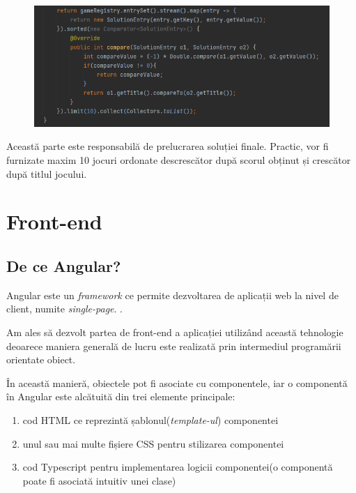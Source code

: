 \documentclass[12pt,a4paper]{report}
\begin{document}
\begin{figure}[H]
\centering
\caption{}
\begin{adjustbox}{max size={\textwidth}{\textheight}}
\includegraphics[scale = 0.9]{exemplu_29_third_part}
\end{adjustbox}
\caption*{}
\end{figure}

Această parte este responsabilă de prelucrarea soluției finale. Practic, vor fi furnizate maxim 10 jocuri ordonate descrescător după scorul obținut și crescător după titlul jocului.

\section{Front-end}

\subsection{De ce Angular?}

Angular este un \emph{framework} ce permite dezvoltarea de aplicații web la nivel de client, numite \emph{single-page}. \cite{31}.

Am ales să dezvolt partea de front-end a aplicației utilizând această tehnologie deoarece maniera generală de lucru este realizată prin intermediul programării orientate obiect.

În această manieră, obiectele pot fi asociate cu componentele, iar o componentă în Angular este alcătuită din trei elemente principale:

\begin{enumerate}
  \item cod HTML ce reprezintă șablonul(\emph{template-ul}) componentei
  \item unul sau mai multe fișiere CSS pentru stilizarea componentei
  \item cod Typescript pentru implementarea logicii componentei(o componentă poate fi asociată intuitiv unei clase) 
\end{enumerate}
\end{document}
